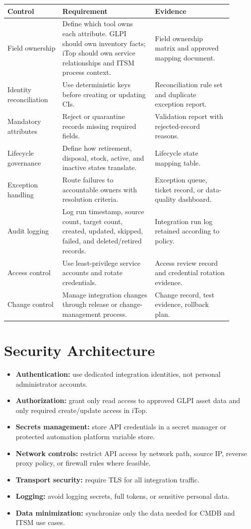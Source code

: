 \documentclass[11pt]{article}
\begin{document}
\begin{longtable}{p{0.22\linewidth}p{0.37\linewidth}p{0.31\linewidth}}
\toprule
\rowcolor{LightBlue}\textbf{Control} & \textbf{Requirement} & \textbf{Evidence} \\
\midrule
Field ownership & Define which tool owns each attribute. GLPI should own inventory facts; iTop should own service relationships and ITSM process context. & Field ownership matrix and approved mapping document. \\
Identity reconciliation & Use deterministic keys before creating or updating CIs. & Reconciliation rule set and duplicate exception report. \\
Mandatory attributes & Reject or quarantine records missing required fields. & Validation report with rejected-record reasons. \\
Lifecycle governance & Define how retirement, disposal, stock, active, and inactive states translate. & Lifecycle state mapping table. \\
Exception handling & Route failures to accountable owners with resolution criteria. & Exception queue, ticket record, or data-quality dashboard. \\
Audit logging & Log run timestamp, source count, target count, created, updated, skipped, failed, and deleted/retired records. & Integration run log retained according to policy. \\
Access control & Use least-privilege service accounts and rotate credentials. & Access review record and credential rotation evidence. \\
Change control & Manage integration changes through release or change-management process. & Change record, test evidence, rollback plan. \\
\bottomrule
\end{longtable}

\section{Security Architecture}

\begin{itemize}
  \item \textbf{Authentication:} use dedicated integration identities, not personal administrator accounts.
  \item \textbf{Authorization:} grant only read access to approved GLPI asset data and only required create/update access in iTop.
  \item \textbf{Secrets management:} store API credentials in a secret manager or protected automation platform variable store.
  \item \textbf{Network controls:} restrict API access by network path, source IP, reverse proxy policy, or firewall rules where feasible.
  \item \textbf{Transport security:} require TLS for all integration traffic.
  \item \textbf{Logging:} avoid logging secrets, full tokens, or sensitive personal data.
  \item \textbf{Data minimization:} synchronize only the data needed for CMDB and ITSM use cases.
\end{itemize}
\end{document}
